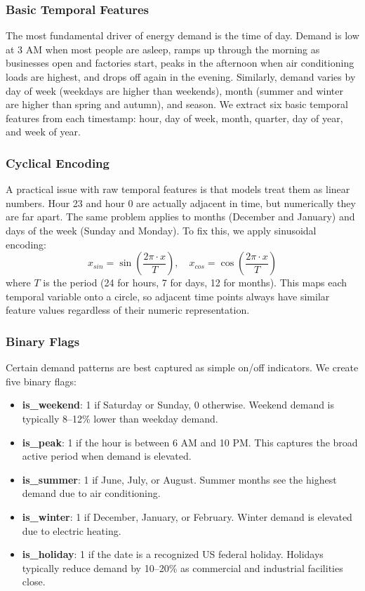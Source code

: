 \documentclass[conference]{IEEEtran}
\begin{document}
\subsubsection{Basic Temporal Features}

The most fundamental driver of energy demand is the time of day. Demand is low at 3 AM when most people are asleep, ramps up through the morning as businesses open and factories start, peaks in the afternoon when air conditioning loads are highest, and drops off again in the evening. Similarly, demand varies by day of week (weekdays are higher than weekends), month (summer and winter are higher than spring and autumn), and season. We extract six basic temporal features from each timestamp: hour, day of week, month, quarter, day of year, and week of year.

\subsubsection{Cyclical Encoding}

A practical issue with raw temporal features is that models treat them as linear numbers. Hour 23 and hour 0 are actually adjacent in time, but numerically they are far apart. The same problem applies to months (December and January) and days of the week (Sunday and Monday). To fix this, we apply sinusoidal encoding:
\begin{equation}
x_{sin} = \sin\left(\frac{2\pi \cdot x}{T}\right), \quad x_{cos} = \cos\left(\frac{2\pi \cdot x}{T}\right)
\end{equation}
where $T$ is the period (24 for hours, 7 for days, 12 for months). This maps each temporal variable onto a circle, so adjacent time points always have similar feature values regardless of their numeric representation.

\subsubsection{Binary Flags}

Certain demand patterns are best captured as simple on/off indicators. We create five binary flags:
\begin{itemize}
    \item \textbf{is\_weekend}: 1 if Saturday or Sunday, 0 otherwise. Weekend demand is typically 8--12\% lower than weekday demand.
    \item \textbf{is\_peak}: 1 if the hour is between 6 AM and 10 PM. This captures the broad active period when demand is elevated.
    \item \textbf{is\_summer}: 1 if June, July, or August. Summer months see the highest demand due to air conditioning.
    \item \textbf{is\_winter}: 1 if December, January, or February. Winter demand is elevated due to electric heating.
    \item \textbf{is\_holiday}: 1 if the date is a recognized US federal holiday. Holidays typically reduce demand by 10--20\% as commercial and industrial facilities close.
\end{itemize}
\end{document}
